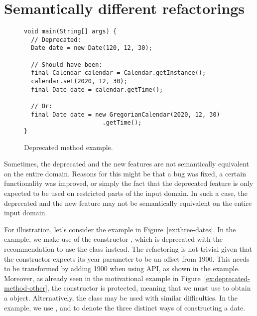 \documentclass[runningheads,a4paper]{llncs}
\begin{document}
\section{Semantically different refactorings}


\begin{figure}
\begin{lstlisting}[mathescape=true,showstringspaces=false]
void main(String[] args) {
  // Deprecated:
  Date date = new Date(120, 12, 30);
 
  // Should have been:
  final Calendar calendar = Calendar.getInstance();
  calendar.set(2020, 12, 30);
  final Date date = calendar.getTime();

  // Or:
  final Date date = new GregorianCalendar(2020, 12, 30)
                      .getTime();
}
\end{lstlisting}
\caption{Deprecated method example.}
\label{ex:deprecated-method}
\end{figure}


Sometimes, the deprecated and the new features are not semantically
equivalent on the entire domain. Reasons for this might be that a bug
was fixed, a certain functionality was improved, or simply the fact
that the deprecated feature is only expected to be used on restricted
parts of the input domain. In such a case, the deprecated and the new
feature may not be semantically equivalent on the entire input domain.

For illustration, let's consider the example in Figure~\ref{ex:three-dates}.
In the example, we make use of the constructor , 
which is deprecated with the 
recommendation to use the  class instead.
The refactoring is not trivial given that the 
 constructor expects its year parameter to be an offset
from 1900.  This needs to be
transformed by adding 1900 when using  API, as shown in the
example. Moreover, as already seen in the motivational example in  Figure~\ref{ex:deprecated-method-other},
the  constructor is protected,
meaning that we must use  to obtain a
 object.
Alternatively, the  class may be used with
similar difficulties.
In the example, we use ,  and  to denote the three distinct ways of constructing a date.

\end{document}
